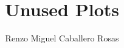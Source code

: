 \documentclass[aspectratio=169]{beamer}\usepackage[utf8]{inputenc}
\title{Unused Plots}
\subtitle{Renzo Miguel Caballero Rosas}
\begin{document}
\begin{frame}
\titlepage
\end{frame}


%
%

%
%
%
%
%
%
%
%
%
%
%
\end{document}
